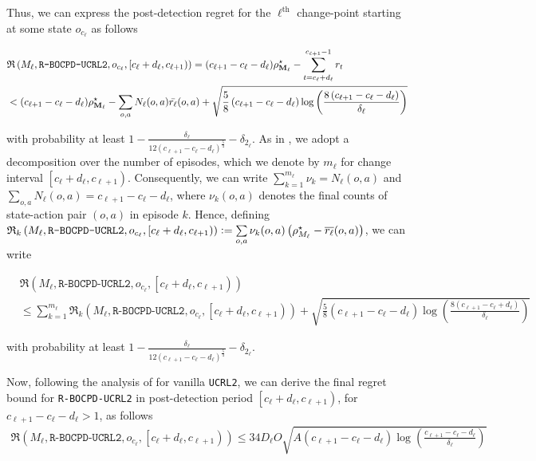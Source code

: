 \documentclass{article} %
\newcommand{\dfq}{\vcentcolon=}
\begin{document}
Thus, we can express the post-detection regret for the $\ell^\text{th}$ change-point starting at some state $o_{c_\ell}$ as follows

\begin{align*}
    & \mathfrak{R}\left(M_\ell, \texttt{R-BOCPD-UCRL2}, o_{c_\ell}, \left[c_\ell+d_{\ell}, c_{\ell+1}\right) \right)= (c_{\ell+1}-c_\ell - d_\ell)\rho_{\mathbf{M_\ell}}^\star-\sum_{t=c_{\ell}+d_{\ell} }^{c_{\ell+1}-1} r_t \\
    & < (c_{\ell+1}-c_\ell - d_\ell) \rho_{\mathbf{M_\ell}}^\star - \sum_{o,a} N_{\ell}(o,a)\Bar{r_{\ell}}(o,a)+\sqrt{\frac{5}{8}\left(c_{\ell+1}- c_{\ell}- d_{\ell} \right)\log\left(\frac{8\left(c_{\ell+1}- c_{\ell}-d_{\ell} \right)}{\delta_\ell}\right)}
\end{align*}

with probability at least $1-\frac{\delta_\ell}{12\left(c_{\ell+1}-c_{\ell}-d_{\ell}\right)^\frac{5}{4}} -\delta_{2_\ell}$. As in \cite{auer2008near}, we adopt a decomposition over the number of episodes, which we denote by $m_\ell$ for change interval  $\left[c_\ell+d_{\ell}, c_{\ell+1}\right)$. Consequently, we can write $\sum\limits_{k=1}^{m_\ell}\nu_{k} = N_\ell(o,a)$ and $\sum\limits_{o, a} N_\ell(o,a) = c_{\ell+1}- c_{\ell}-d_{\ell}$, where $\nu_k (o, a)$ denotes the final counts of state-action pair $(o, a)$ in episode $k$. Hence, defining $\mathfrak{R}_k \left(M_\ell, \texttt{R-BOCPD-UCRL2}, o_{c_\ell}, \left[c_\ell+d_{\ell}, c_{\ell+1}\right) \right) \dfq \sum\limits_{o,a}\nu_{k}(o,a) \left(\rho_{M_\ell}^\star-\overline{r_{\ell}}(o,a) \right)$, we can write

\begin{align*}
    & \mathfrak{R} \left(M_\ell, \texttt{R-BOCPD-UCRL2}, o_{c_\ell}, \left[c_\ell+d_{\ell}, c_{\ell+1}\right) \right) \\
    & \leq \sum_{k=1}^{m_\ell} \mathfrak{R}_k \left(M_\ell, \texttt{R-BOCPD-UCRL2}, o_{c_\ell}, \left[c_\ell+d_{\ell}, c_{\ell+1}\right) \right) 
     + \sqrt{\frac{5}{8}\left(c_{\ell+1}-c_{\ell}-d_{\ell}\right)\log\left(\frac{8\left(c_{\ell+1}- c_{\ell}+d_{\ell}\right)}{\delta_\ell}\right)}
\end{align*}

with probability at least $1-\frac{\delta_\ell}{12\left(c_{\ell+1}- c_{\ell}-d_{\ell}\right)^\frac{5}{4}} -\delta_{2_\ell}$. 

Now, following the analysis of \cite{auer2008near} for vanilla \texttt{UCRL2}, we can derive the final regret bound for \texttt{R-BOCPD-UCRL2} in post-detection period $\left[c_\ell+d_{\ell}, c_{\ell+1}\right)$, for $c_{\ell+1}-c_{\ell}-d_{\ell} > 1$, as follows 
\begin{align*}
    \mathfrak{R} \left(M_\ell, \texttt{R-BOCPD-UCRL2}, o_{c_\ell}, \left[c_\ell+d_{\ell}, c_{\ell+1}\right) \right) \leq 34 D_\ell O \sqrt{A \left(c_{\ell+1}-c_{\ell}-d_{\ell} \right) \log\left(\frac{c_{\ell+1}-c_{\ell}-d_{\ell}}{\delta_\ell} \right)}
\end{align*}
\end{document}
